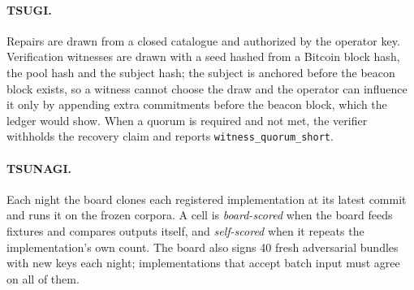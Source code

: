 \documentclass[11pt,a4paper]{article}
\newcommand{\code}[1]{\texttt{#1}}
\begin{document}
\paragraph{TSUGI.} Repairs are drawn from a closed catalogue and authorized by the operator key. Verification witnesses are drawn with a seed hashed from a Bitcoin block hash, the pool hash and the subject hash; the subject is anchored before the beacon block exists, so a witness cannot choose the draw and the operator can influence it only by appending extra commitments before the beacon block, which the ledger would show. When a quorum is required and not met, the verifier withholds the recovery claim and reports \code{witness\_quorum\_short}.

\paragraph{TSUNAGI.} Each night the board clones each registered implementation at its latest commit and runs it on the frozen corpora. A cell is \emph{board-scored} when the board feeds fixtures and compares outputs itself, and \emph{self-scored} when it repeats the implementation's own count. The board also signs 40 fresh adversarial bundles with new keys each night; implementations that accept batch input must agree on all of them.
\end{document}
